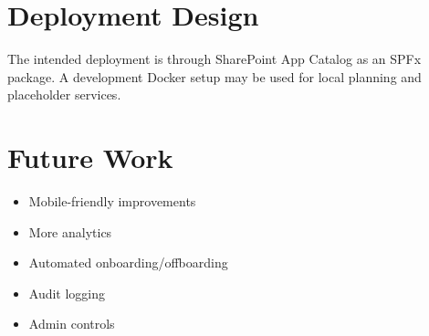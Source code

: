\documentclass[12pt]{article}
\begin{document}
\section{Deployment Design}
The intended deployment is through SharePoint App Catalog as an SPFx package. A development Docker setup may be used for local planning and placeholder services.

\section{Future Work}
\begin{itemize}
\item Mobile-friendly improvements
\item More analytics
\item Automated onboarding/offboarding
\item Audit logging
\item Admin controls
\end{itemize}
\end{document}
